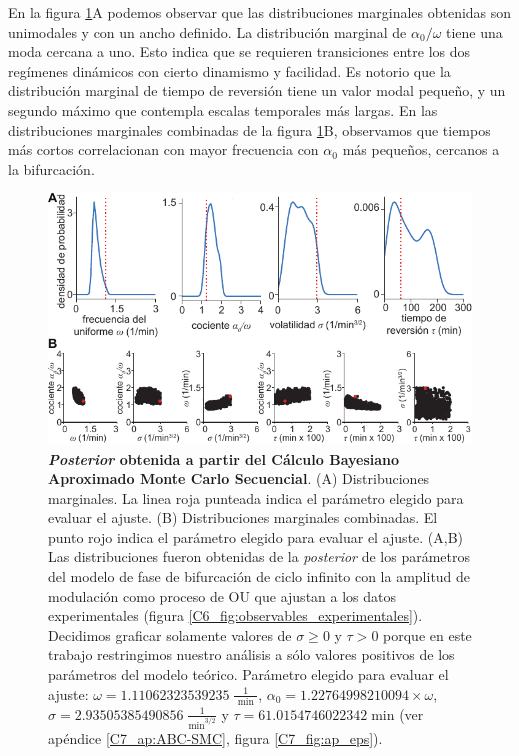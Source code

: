 \documentclass[./main.tex]{subfiles}
\begin{document}
En la figura \ref{C7_fig:OU_fit}A podemos observar que las distribuciones marginales obtenidas son unimodales y con un ancho definido. La distribución marginal de $\alpha_0/\omega$ tiene una moda cercana a uno. Esto indica que se requieren transiciones entre los dos regímenes dinámicos con cierto dinamismo y facilidad. Es notorio que la distribución marginal de tiempo de reversión tiene un valor modal pequeño, y un segundo máximo que contempla escalas temporales más largas. En las distribuciones marginales combinadas de la figura \ref{C7_fig:OU_fit}B, observamos que tiempos más cortos correlacionan con mayor frecuencia con $\alpha_0$ más pequeños, cercanos a la bifurcación. 


\begin{figure}
    \centering
    \includegraphics[width=1\columnwidth]{figures/chapter7/C7_OU_fit.pdf} 
    \caption{\textbf{\textit{Posterior} obtenida a partir del Cálculo Bayesiano Aproximado Monte Carlo Secuencial}. (A) Distribuciones marginales. La linea roja punteada indica el parámetro elegido para evaluar el ajuste. (B) Distribuciones marginales combinadas. El punto rojo indica el parámetro elegido para evaluar el ajuste. (A,B) Las distribuciones fueron obtenidas de la \textit{posterior} de los parámetros del modelo de fase de bifurcación de ciclo infinito con la amplitud de modulación como proceso de OU que ajustan a los datos experimentales (figura \ref{C6_fig:observables_experimentales}). Decidimos graficar solamente valores de $\sigma \geq 0$ y $\tau > 0$ porque en este trabajo restringimos nuestro análisis a sólo valores positivos de los parámetros del modelo teórico. Parámetro elegido para evaluar el ajuste: $\omega = 1.11062323539235\; \frac{1}{\text{ min }}$, $\alpha_0 = 1.22764998210094 \times \omega$, $ \sigma = 2.93505385490856 \; \frac{1}{\text{min}^{3/2}}$ y $\tau = 61.0154746022342 \; \text{min} $ (ver apéndice \ref{C7_ap:ABC-SMC}, figura \ref{C7_fig:ap_eps}).}
    \label{C7_fig:OU_fit}
\end{figure} 
\end{document}
